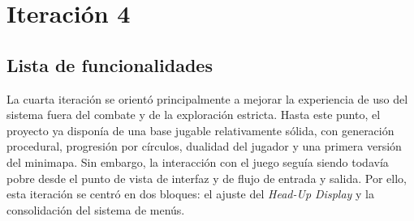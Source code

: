 \chapter{Iteración 4}

\begin{abstract}
Esta iteración se orienta a mejorar la interacción del usuario con el sistema a través de
la interfaz. Se consolidan el \textit{Head-Up Display} y los menús principales del juego,
aportando mayor legibilidad, control de la partida y coherencia en la experiencia de uso.
\end{abstract}

\section{Lista de funcionalidades}
La cuarta iteración se orientó principalmente a mejorar la experiencia de uso del sistema
fuera del combate y de la exploración estricta. Hasta este punto, el proyecto ya disponía
de una base jugable relativamente sólida, con generación procedural, progresión por
círculos, dualidad del jugador y una primera versión del minimapa. Sin embargo, la
interacción con el juego seguía siendo todavía pobre desde el punto de vista de interfaz y
de flujo de entrada y salida. Por ello, esta iteración se centró en dos bloques: el ajuste
del \textit{Head-Up Display} y la consolidación del sistema de menús.

